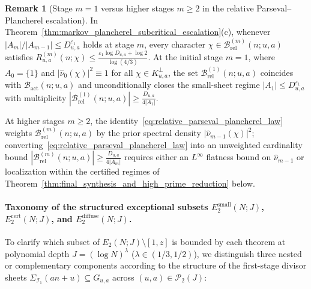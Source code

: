 \documentclass[11pt, a4paper]{article}
\theoremstyle{plain}
\theoremstyle{definition}
\newtheorem{remark}[theorem]{Remark}
\begin{document}
\begin{remark}[Stage $m=1$ versus higher stages $m\ge 2$ in the relative Parseval--Plancherel escalation]
In Theorem~\ref{thm:markov_plancherel_subcritical_escalation}(c), whenever $|A_m|/|A_{m-1}|\le D_{u,a}^{\varepsilon_1}$ holds at stage $m$, every character $\chi\in\mathcal{B}_{\mathrm{rel}}^{(m)}(n;u,a)$ satisfies $R_{u,a}^{(m)}(n;\chi)\le\frac{\varepsilon_1\log D_{u,a}+\log 2}{\log(4/3)}$. At the initial stage $m=1$, where $A_0=\{1\}$ and $|\widehat{\nu}_0(\chi)|^{2}\equiv 1$ for all $\chi\in K_{u,a}^{\perp}$, the set $\mathcal{B}_{\mathrm{rel}}^{(1)}(n;u,a)$ coincides with $\mathcal{B}_{\mathrm{act}}(n;u,a)$ and unconditionally closes the small-sheet regime $|A_1|\le D_{u,a}^{\varepsilon_1}$ with multiplicity $|\mathcal{B}_{\mathrm{rel}}^{(1)}(n;u,a)|\ge\frac{D_{u,a}}{4|A_1|}$. 

At higher stages $m\ge 2$, the identity~\eqref{eq:relative_parseval_plancherel_law} weights $\mathcal{B}_{\mathrm{rel}}^{(m)}(n;u,a)$ by the prior spectral density $|\widehat{\nu}_{m-1}(\chi)|^{2}$; converting~\eqref{eq:relative_parseval_plancherel_law} into an unweighted cardinality bound $|\mathcal{B}_{\mathrm{rel}}^{(m)}(n;u,a)|\ge\frac{D_{u,a}}{4|A_m|}$ requires either an $L^{\infty}$ flatness bound on $\widehat{\nu}_{m-1}$ or localization within the certified regimes of Theorem~\ref{thm:final_synthesis_and_high_prime_reduction} below.
\end{remark}

\paragraph{Taxonomy of the structured exceptional subsets $E_2^{\mathrm{small}}(N;J)$, $E_2^{\mathrm{cert}}(N;J)$, and $E_2^{\mathrm{diffuse}}(N;\allowbreak J)$.}
To clarify which subset of $E_2(N;J)\setminus[1,z]$ is bounded by each theorem at polynomial depth $J=(\log N)^{\lambda}$ ($\lambda\in(1/3,1/2)$), we distinguish three nested or complementary components according to the structure of the first-stage divisor sheets $\Sigma_{\mathcal{I}_1}(an+u)\subseteq G_{u,a}$ across $(u,a)\in\mathcal{P}_2(J)$:
\end{document}
